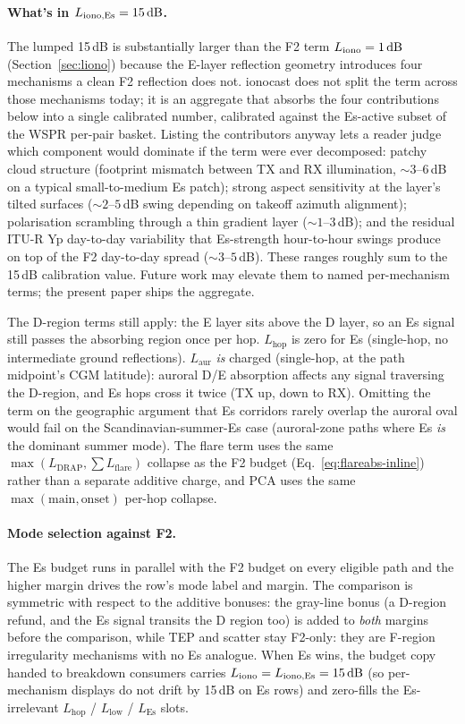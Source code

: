 \documentclass[11pt,a4paper]{article}
\newcommand{\SI}[2]{#1\,\text{#2}}
\newcommand{\dB}{\text{dB}}
\begin{document}
\paragraph{What's in $L_{\text{iono,Es}} = \SI{15}{\dB}$.} The
lumped 15\,dB is substantially larger than the F2 term
$L_{\text{iono}} = \SI{1}{\dB}$ (Section~\ref{sec:liono}) because
the E-layer reflection geometry introduces four mechanisms a clean
F2 reflection does not.  ionocast does not split the term across
those mechanisms today; it is an aggregate that absorbs the four
contributions below into a single calibrated number, calibrated
against the Es-active subset of the WSPR per-pair basket.
Listing the contributors anyway lets a reader judge which
component would dominate if the term were ever decomposed:
patchy cloud structure (footprint mismatch between TX and RX
illumination, ${\sim}3$--$6$\,dB on a typical small-to-medium Es
patch); strong aspect sensitivity at the layer's tilted surfaces
(${\sim}2$--$5$\,dB swing depending on takeoff azimuth alignment);
polarisation scrambling through a thin gradient layer
(${\sim}1$--$3$\,dB); and the residual ITU-R Yp day-to-day
variability that Es-strength hour-to-hour swings produce on top of
the F2 day-to-day spread (${\sim}3$--$5$\,dB).  These ranges
roughly sum to the 15\,dB calibration value.  Future work may
elevate them to named per-mechanism terms; the present paper
ships the aggregate.

The D-region terms still apply: the E layer sits above the D
layer, so an Es signal still passes the absorbing region once per
hop.  $L_{\text{hop}}$ is zero for Es (single-hop, no intermediate
ground reflections).  $L_{\text{aur}}$ \emph{is} charged
(single-hop, at the path midpoint's CGM latitude): auroral D/E
absorption affects any signal traversing the D-region, and Es
hops cross it twice (TX up, down to RX).  Omitting the term
on the geographic argument that Es corridors
rarely overlap the auroral oval would fail on the
Scandinavian-summer-Es case
(auroral-zone paths where Es \emph{is} the dominant summer
mode).  The flare
term uses the same $\max(L_{\text{DRAP}}, \sum L_{\text{flare}})$
collapse as the F2 budget (Eq.~\ref{eq:flareabs-inline}) rather
than a separate additive charge, and PCA uses the same
$\max(\text{main}, \text{onset})$ per-hop collapse.

\paragraph{Mode selection against F2.}  The Es budget runs in
parallel with the F2 budget on every eligible path and the higher
margin drives the row's mode label and margin.  The comparison is
symmetric with respect to the additive bonuses: the gray-line
bonus (a D-region refund, and the Es signal transits the D region
too) is added to \emph{both} margins before the comparison, while
TEP and scatter stay F2-only: they are F-region irregularity
mechanisms with no Es analogue.  When Es wins, the budget copy
handed to breakdown consumers carries $L_{\text{iono}} =
L_{\text{iono,Es}} = \SI{15}{\dB}$ (so per-mechanism displays do
not drift by 15\,dB on Es rows) and zero-fills the Es-irrelevant
$L_{\text{hop}}$ / $L_{\text{low}}$ / $L_{\text{Es}}$ slots.
\end{document}
